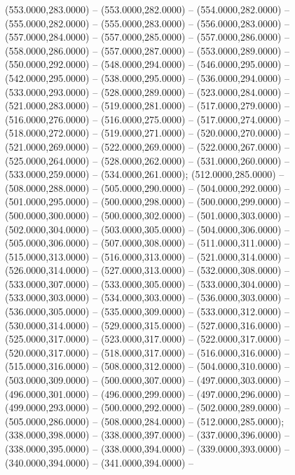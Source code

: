\begin{scope}[shift={(-231.87,-121.87)}]
\begin{scope}[draw=black,fill=cfdae61,line join=round,line width=0.208pt]
        (553.0000,283.0000) -- (553.0000,282.0000) -- (554.0000,282.0000) --
        (555.0000,282.0000) -- (555.0000,283.0000) -- (556.0000,283.0000) --
        (557.0000,284.0000) -- (557.0000,285.0000) -- (557.0000,286.0000) --
        (558.0000,286.0000) -- (557.0000,287.0000) -- (553.0000,289.0000) --
        (550.0000,292.0000) -- (548.0000,294.0000) -- (546.0000,295.0000) --
        (542.0000,295.0000) -- (538.0000,295.0000) -- (536.0000,294.0000) --
        (533.0000,293.0000) -- (528.0000,289.0000) -- (523.0000,284.0000) --
        (521.0000,283.0000) -- (519.0000,281.0000) -- (517.0000,279.0000) --
        (516.0000,276.0000) -- (516.0000,275.0000) -- (517.0000,274.0000) --
        (518.0000,272.0000) -- (519.0000,271.0000) -- (520.0000,270.0000) --
        (521.0000,269.0000) -- (522.0000,269.0000) -- (522.0000,267.0000) --
        (525.0000,264.0000) -- (528.0000,262.0000) -- (531.0000,260.0000) --
        (533.0000,259.0000) -- (534.0000,261.0000);
       (512.0000,285.0000) -- (508.0000,288.0000) --
        (505.0000,290.0000) -- (504.0000,292.0000) -- (501.0000,295.0000) --
        (500.0000,298.0000) -- (500.0000,299.0000) -- (500.0000,300.0000) --
        (500.0000,302.0000) -- (501.0000,303.0000) -- (502.0000,304.0000) --
        (503.0000,305.0000) -- (504.0000,306.0000) -- (505.0000,306.0000) --
        (507.0000,308.0000) -- (511.0000,311.0000) -- (515.0000,313.0000) --
        (516.0000,313.0000) -- (521.0000,314.0000) -- (526.0000,314.0000) --
        (527.0000,313.0000) -- (532.0000,308.0000) -- (533.0000,307.0000) --
        (533.0000,305.0000) -- (533.0000,304.0000) -- (533.0000,303.0000) --
        (534.0000,303.0000) -- (536.0000,303.0000) -- (536.0000,305.0000) --
        (535.0000,309.0000) -- (533.0000,312.0000) -- (530.0000,314.0000) --
        (529.0000,315.0000) -- (527.0000,316.0000) -- (525.0000,317.0000) --
        (523.0000,317.0000) -- (522.0000,317.0000) -- (520.0000,317.0000) --
        (518.0000,317.0000) -- (516.0000,316.0000) -- (515.0000,316.0000) --
        (508.0000,312.0000) -- (504.0000,310.0000) -- (503.0000,309.0000) --
        (500.0000,307.0000) -- (497.0000,303.0000) -- (496.0000,301.0000) --
        (496.0000,299.0000) -- (497.0000,296.0000) -- (499.0000,293.0000) --
        (500.0000,292.0000) -- (502.0000,289.0000) -- (505.0000,286.0000) --
        (508.0000,284.0000) -- (512.0000,285.0000);
       (338.0000,398.0000) -- (338.0000,397.0000) --
        (337.0000,396.0000) -- (338.0000,395.0000) -- (338.0000,394.0000) --
        (339.0000,393.0000) -- (340.0000,394.0000) -- (341.0000,394.0000) --

\end{scope}
\end{scope}
